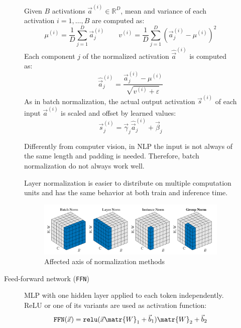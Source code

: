 \begin{description}
\begin{description}
                Given $B$ activations $\vec{a}^{(i)} \in \mathbb{R}^{D}$, mean and variance of each activation $i=1, \dots, B$ are computed as:
                \[ \mu^{(i)} = \frac{1}{D} \sum_{j=1}^{D} \vec{a}^{(i)}_{j} \qquad v^{(i)} = \frac{1}{D} \sum_{j=1}^{D} \left( \vec{a}^{(i)}_j - \mu^{(i)} \right)^2 \]
                Each component $j$ of the normalized activation $\hat{\vec{a}}^{(i)}$ is computed as:
                \[ \hat{\vec{a}}^{(i)}_{j} = \frac{\vec{a}^{(i)}_j - \mu^{(i)}}{\sqrt{v^{(i)} + \varepsilon}} \]
                As in batch normalization, the actual output activation $\vec{s}^{(i)}$ of each input $\vec{a}^{(i)}$ is scaled and offset by learned values:
                \[ \vec{s}^{(i)}_j = \vec{\gamma}_j \hat{\vec{a}}^{(i)}_j + \vec{\beta}_j \]

                \begin{remark}
                    Differently from computer vision, in NLP the input is not always of the same length and padding is needed. Therefore, batch normalization do not always work well.
                \end{remark}

                \begin{remark}
                    Layer normalization is easier to distribute on multiple computation units and has the same behavior at both train and inference time.
                \end{remark}

                \begin{figure}[H]
                    \centering
                    \includegraphics[width=0.8\linewidth]{./img/norm_methods.png}
                    \caption{Affected axis of normalization methods}
                \end{figure}

            \item[Feed-forward network (\texttt{FFN})] 
                MLP with one hidden layer applied to each token independently. ReLU or one of its variants are used as activation function:
                \[ \texttt{FFN}(\vec{x}) = \texttt{relu}(\vec{x}\matr{W}_1 + \vec{b}_1)\matr{W}_2 + \vec{b}_2 \]


\end{description}
\end{description}
